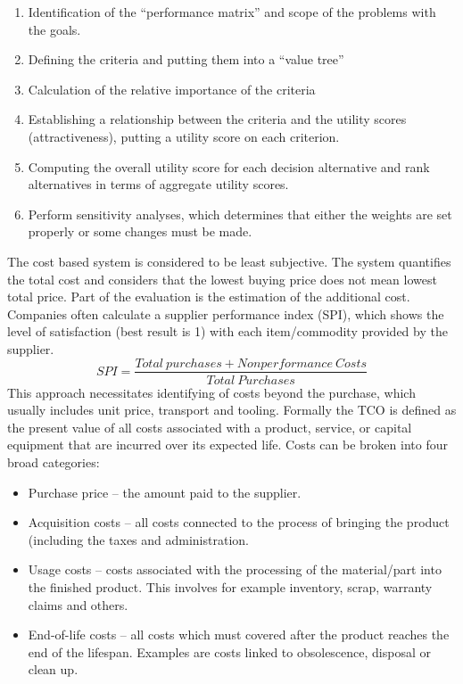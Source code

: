 \documentclass[oneside,12pt]{article}%
\begin{document}
\begin{enumerate}
  \item Identification of the “performance matrix” and scope of the problems with the goals.
  \item Defining the criteria and putting them into a “value tree”
  \item Calculation of the relative importance of the criteria
  \item Establishing a relationship between the criteria and the utility scores (attractiveness), putting a utility score on each criterion.
  \item Computing the overall utility score for each decision alternative and rank alternatives in terms of aggregate utility scores.
  \item Perform sensitivity analyses, which determines that either the weights are set properly or some changes must be made.
\end{enumerate}


The cost based system is considered to be least subjective. The system quantifies the total cost and considers that the lowest buying price does not mean lowest total price. Part of the evaluation is the estimation of the additional cost. Companies often calculate a supplier performance index (SPI), which shows the level of satisfaction (best result is 1) with each item/commodity provided by the supplier.
\newline
$$SPI = \frac{Total \: purchases + Nonperformance \: Costs}{Total \: Purchases}$$
\newline
This approach necessitates identifying of costs beyond the purchase, which usually includes unit price, transport and tooling. Formally the TCO is defined as the present value of all costs associated with a product, service, or capital equipment that are incurred over its expected life. Costs can be broken into four broad categories:


\begin{itemize}
\item Purchase price – the amount paid to the supplier.
\item Acquisition costs – all costs connected to the process of bringing the product (including the taxes and administration.
\item Usage costs – costs associated with the processing of the material/part into the finished product. This involves for example inventory, scrap, warranty claims and others.
\item End-of-life costs – all costs which must covered after the product reaches the end of the lifespan. Examples are costs linked to obsolescence, disposal or clean up.
\end{itemize}
\end{document}
